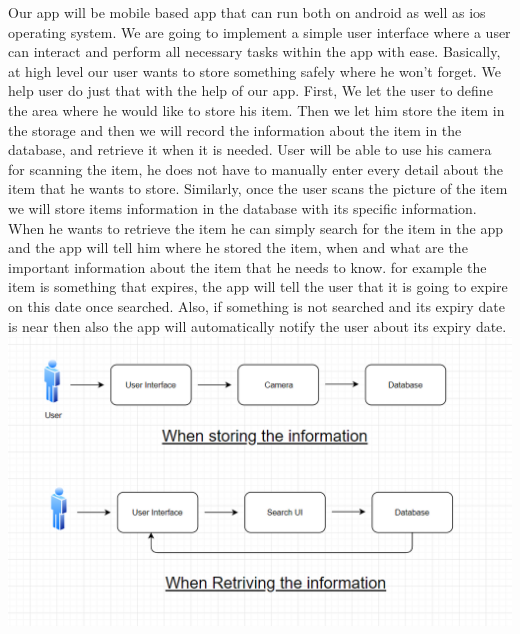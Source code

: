 Our app will be mobile based app that can run both on android as well as ios operating system. We are going to implement a simple user interface where a user can interact and perform all necessary tasks within the app with ease. Basically, at high level our user wants to store something safely where he won't forget. We help user do just that with the help of our app. First, We let the user to define the area where he would like to store his item. Then we let him store the item in the storage and then we will record the information about the item in the database, and retrieve it when it is needed. User will be able to use his camera for scanning the item, he does not have to manually enter every detail about the item that he wants to store. Similarly, once the user scans the picture of the item we will store items information in the database with its specific information. When he wants to retrieve the item he can simply search for the item in the app and the app will tell him where he stored the item, when and what are the important information about the item that he needs to know. for example the item is something that expires, the app will tell the user that it is going to expire on this date once searched. Also, if something is not searched and its expiry date is near then also the app will automatically notify the user about its expiry date. 
\includegraphics{project charter latex/images/component.PNG}